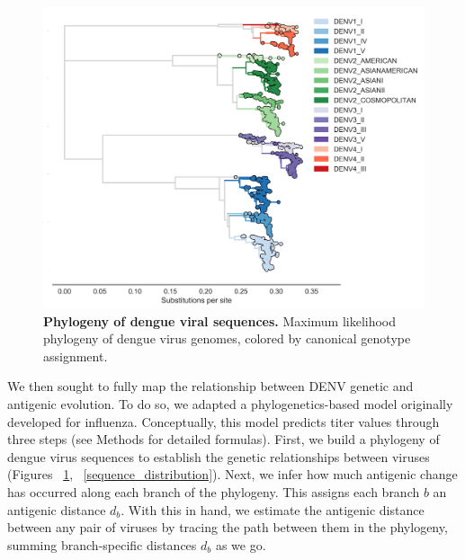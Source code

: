 \documentclass[11pt,oneside,letterpaper]{article}
\begin{document}
\begin{figure}[h]
  \begin{centering}
    \includegraphics[width=\linewidth]{../figures/png/genotype_tree.png}
  	\caption{\textbf{Phylogeny of dengue viral sequences.}  Maximum likelihood phylogeny of dengue virus genomes, colored by canonical genotype assignment.}
  	\label{genotype_tree}
  \end{centering}
\end{figure}

We then sought to fully map the relationship between DENV genetic and antigenic evolution.
To do so, we adapted a phylogenetics-based model originally developed for influenza.
Conceptually, this model predicts titer values through three steps (see Methods for detailed formulas).
First, we build a phylogeny of dengue virus sequences to establish the genetic relationships between viruses (Figures ~\ref{genotype_tree}, ~\ref{sequence_distribution}).
Next, we infer how much antigenic change has occurred along each branch of the phylogeny.
This assigns each branch $b$ an antigenic distance $d_b$.
With this in hand, we estimate the antigenic distance between any pair of viruses by tracing the path between them in the phylogeny, summing branch-specific distances $d_b$ as we go.
\end{document}
